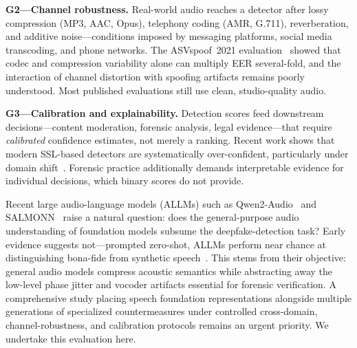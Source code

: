 \textbf{G2---Channel robustness.} Real-world audio reaches a detector after lossy
compression (MP3, AAC, Opus), telephony coding (AMR, G.711), reverberation, and additive
noise---conditions imposed by messaging platforms, social media transcoding, and phone
networks. The ASVspoof~2021 evaluation~\cite{liu2023asvspoof2021} showed that codec and
compression variability alone can multiply EER several-fold, and the interaction of
channel distortion with spoofing artifacts remains poorly understood. Most published
evaluations still use clean, studio-quality audio.

\textbf{G3---Calibration and explainability.} Detection scores feed downstream
decisions---content moderation, forensic analysis, legal evidence---that require
\emph{calibrated} confidence estimates, not merely a ranking. Recent work shows that
modern SSL-based detectors are systematically over-confident, particularly under domain
shift~\cite{pascu2024calibrated}. Forensic practice additionally demands interpretable
evidence for individual decisions, which binary scores do not provide.

Recent large audio-language models (ALLMs) such as Qwen2-Audio~\cite{chu2024qwen2audio}
and SALMONN~\cite{tang2024salmonn} raise a natural question: does the general-purpose
audio understanding of foundation models subsume the deepfake-detection task? Early
evidence suggests not---prompted zero-shot, ALLMs perform near chance at distinguishing
bona-fide from synthetic speech~\cite{gong2025allm4add}. This stems from their objective:
general audio models compress acoustic semantics while abstracting away the low-level
phase jitter and vocoder artifacts essential for forensic verification. A comprehensive
study placing speech foundation representations alongside multiple generations of
specialized countermeasures under controlled cross-domain, channel-robustness, and
calibration protocols remains an urgent priority. We undertake this evaluation here.

